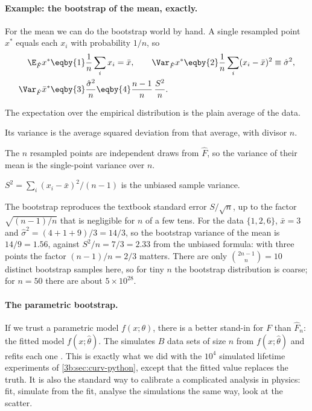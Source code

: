 \paragraph{Example: the bootstrap of the mean, exactly.}
For the mean we can do the bootstrap world by hand. A single resampled
point $x^*$ equals each $x_i$ with probability $1/n$, so
\begin{align*}
  \E_{\hat F}x^*&\eqby{1}\frac1n\sum_ix_i=\bar x,\qquad
  \Var_{\hat F}x^*\eqby{2}\frac1n\sum_i(x_i-\bar x)^2\equiv\hat\sigma^2,\\
  \Var_{\hat F}\bar x^*&\eqby{3}\frac{\hat\sigma^2}{n}
  \eqby{4}\frac{n-1}{n}\,\frac{S^2}{n} .
\end{align*}
\begin{explain}
  \item The expectation over the empirical distribution is the plain
        average of the data.
  \item Its variance is the average squared deviation from that average,
        with divisor $n$.
  \item The $n$ resampled points are independent draws from $\hat F$, so the
        variance of their mean is the single-point variance over $n$.
  \item $S^2=\sum_i(x_i-\bar x)^2/(n-1)$ is the unbiased sample variance.
\end{explain}
The bootstrap reproduces the textbook standard error $S/\sqrt n$, up to the
factor $\sqrt{(n-1)/n}$ that is negligible for $n$ of a few tens. For the
data $\{1,2,6\}$, $\bar x=3$ and $\hat\sigma^2=(4+1+9)/3=14/3$, so the
bootstrap variance of the mean is $14/9=1.56$, against $S^2/n=7/3=2.33$ from
the unbiased formula: with three points the factor $(n-1)/n=2/3$ matters.
There are only $\binom{2n-1}{n}=10$ distinct bootstrap samples here, so for
tiny $n$ the bootstrap distribution is coarse; for $n=50$ there are about
$5\times10^{28}$.

\paragraph{The parametric bootstrap.}
If we trust a parametric model $f(x;\theta)$, there is a better stand-in
for $F$ than $\hat F_n$: the fitted model $f(x;\hat\theta)$. The
 simulates $B$ data sets of size $n$ from
$f(x;\hat\theta)$ and refits each one . This is exactly
what we did with the $10^4$ simulated lifetime experiments of
\cref{3b:sec:curv-python}, except that the fitted value replaces the truth.
It is also the standard way to calibrate a
complicated analysis in physics: fit, simulate from the fit, analyse the
simulations the same way, look at the scatter.

